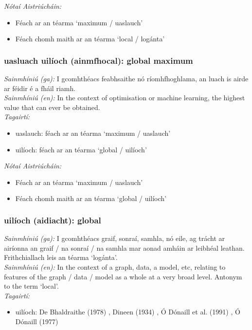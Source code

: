  \noindent \textit{Nótaí Aistriúcháin:}
\begin{itemize}
	\item Féach ar an téarma `maximum / uaslauch'
	\item Féach chomh maith ar an téarma `local / logánta'
\end{itemize}


\subsubsection*{uasluach uilíoch (ainmfhocal): global maximum}
 \noindent \textit{Sainmhíniú (ga):} I gcomhthéacs feabhsaithe nó ríomhfhoghlama, an luach is airde ar féidir é a fháil riamh.
\\
 \noindent \textit{Sainmhíniú (en):} In the context of optimisation or machine learning, the highest value that can ever be obtained.
\\
 \noindent \textit{Tagairtí:}
\begin{itemize}
	\item uaslauch: féach ar an téarma `maximum / uaslauch'
	\item uilíoch: féach ar an téarma `global / uilíoch'
\end{itemize}

 \noindent \textit{Nótaí Aistriúcháin:}
\begin{itemize}
	\item Féach ar an téarma `maximum / uaslauch'
	\item Féach chomh maith ar an téarma `global / uilíoch'
\end{itemize}


\subsubsection*{uilíoch (aidiacht): global}
 \noindent \textit{Sainmhíniú (ga):} I gcomhthéacs graif, sonraí, samhla, nó eile, ag trácht ar airíonna an graif / na sonraí / na samhla mar aonad amháin ar leibhéal leathan. Frithchiallach leis an téarma `logánta'.
\\
 \noindent \textit{Sainmhíniú (en):} In the context of a graph, data, a model, etc, relating to features of the graph / data / model as a whole at a very broad level. Antonym to the term `local'.
\\
 \noindent \textit{Tagairtí:}
\begin{itemize}
	\item uilíoch: De Bhaldraithe (1978) \cite{de-bhaldraithe}, Dineen (1934) \cite{dineen}, Ó Dónaill et al. (1991) \cite{focloir-beag}, Ó Dónaill (1977) \cite{odonaill}
\end{itemize}

